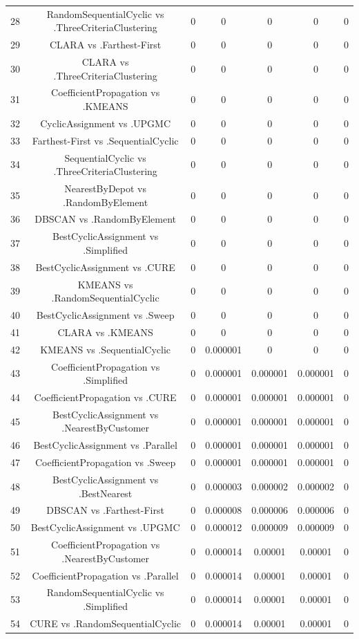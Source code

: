 \documentclass[a4paper,10pt]{article}
\begin{document}
\begin{landscape}
\begin{table}[!htp]
\begin{tabular}{ccccccc}
28&RandomSequentialCyclic vs .ThreeCriteriaClustering&0&0&0&0&0\\
29&CLARA vs .Farthest-First&0&0&0&0&0\\
30&CLARA vs .ThreeCriteriaClustering&0&0&0&0&0\\
31&CoefficientPropagation vs .KMEANS&0&0&0&0&0\\
32&CyclicAssignment vs .UPGMC&0&0&0&0&0\\
33&Farthest-First vs .SequentialCyclic&0&0&0&0&0\\
34&SequentialCyclic vs .ThreeCriteriaClustering&0&0&0&0&0\\
35&NearestByDepot vs .RandomByElement&0&0&0&0&0\\
36&DBSCAN vs .RandomByElement&0&0&0&0&0\\
37&BestCyclicAssignment vs .Simplified&0&0&0&0&0\\
38&BestCyclicAssignment vs .CURE&0&0&0&0&0\\
39&KMEANS vs .RandomSequentialCyclic&0&0&0&0&0\\
40&BestCyclicAssignment vs .Sweep&0&0&0&0&0\\
41&CLARA vs .KMEANS&0&0&0&0&0\\
42&KMEANS vs .SequentialCyclic&0&0.000001&0&0&0\\
43&CoefficientPropagation vs .Simplified&0&0.000001&0.000001&0.000001&0\\
44&CoefficientPropagation vs .CURE&0&0.000001&0.000001&0.000001&0\\
45&BestCyclicAssignment vs .NearestByCustomer&0&0.000001&0.000001&0.000001&0\\
46&BestCyclicAssignment vs .Parallel&0&0.000001&0.000001&0.000001&0\\
47&CoefficientPropagation vs .Sweep&0&0.000001&0.000001&0.000001&0\\
48&BestCyclicAssignment vs .BestNearest&0&0.000003&0.000002&0.000002&0\\
49&DBSCAN vs .Farthest-First&0&0.000008&0.000006&0.000006&0\\
50&BestCyclicAssignment vs .UPGMC&0&0.000012&0.000009&0.000009&0\\
51&CoefficientPropagation vs .NearestByCustomer&0&0.000014&0.00001&0.00001&0\\
52&CoefficientPropagation vs .Parallel&0&0.000014&0.00001&0.00001&0\\
53&RandomSequentialCyclic vs .Simplified&0&0.000014&0.00001&0.00001&0\\
54&CURE vs .RandomSequentialCyclic&0&0.000014&0.00001&0.00001&0\\

\end{tabular}
\end{table}
\end{landscape}
\end{document}
